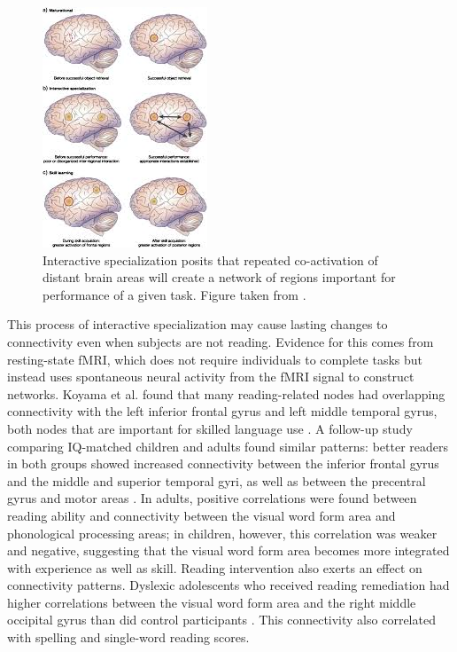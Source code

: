 \begin{figure}[h!]
\centering
\includegraphics[]{images/ch1-interactive-specialization.jpg}
    \caption{Interactive specialization posits that repeated co-activation of distant brain areas will create a network of regions important for performance of a given task. Figure taken from \cite{Gaffrey2012}.}
\label{fig:ch1-interactive-specialization}
\end{figure}

This process of interactive specialization may cause lasting changes to connectivity even when subjects are not reading. Evidence for this comes from resting-state fMRI, which does not require individuals to complete tasks but instead uses spontaneous neural activity from the fMRI signal to construct networks. Koyama et al. found that many reading-related nodes had overlapping connectivity with the left inferior frontal gyrus and left middle temporal gyrus, both nodes that are important for skilled language use \cite{Koyama2010}. A follow-up study comparing IQ-matched children and adults found similar patterns: better readers in both groups showed increased connectivity between the inferior frontal gyrus and the middle and superior temporal gyri, as well as between the precentral gyrus and motor areas \cite{Koyama2011}. In adults, positive correlations were found between reading ability and connectivity between the visual word form area and phonological processing areas; in children, however, this correlation was weaker and negative, suggesting that the visual word form area becomes more integrated with experience as well as skill. Reading intervention also exerts an effect on connectivity patterns. Dyslexic adolescents who received reading remediation had higher correlations between the visual word form area and the right middle occipital gyrus than did control participants \cite{Koyama2013}. This connectivity also correlated with spelling and single-word reading scores.


